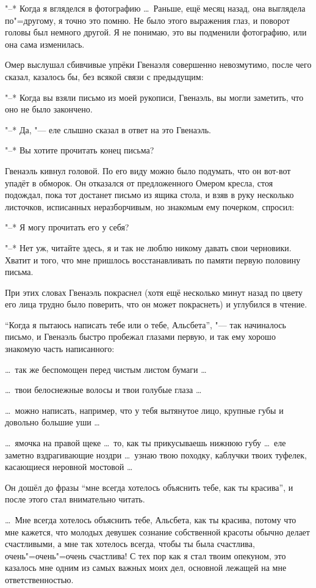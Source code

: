 "--* Когда я вгляделся в фотографию \ldots\
Раньше, ещё месяц назад, она выглядела по"=другому, я точно это помню.
Не было этого выражения глаз, и поворот головы был немного другой.
Я не понимаю, это вы подменили фотографию, или она сама изменилась.

Омер выслушал сбивчивые упрёки Гвенаэля совершенно невозмутимо, после чего
сказал, казалось бы, без всякой связи с предыдущим:

"--* Когда вы взяли письмо из моей рукописи, Гвенаэль, вы могли заметить, что
оно не было закончено.

"--* Да, "--- еле слышно сказал в ответ на это Гвенаэль.

"--* Вы хотите прочитать конец письма?

Гвенаэль кивнул головой.
По его виду можно было подумать, что он вот-вот упадёт в обморок.
Он отказался от предложенного Омером кресла, стоя подождал, пока тот достанет
письмо из ящика стола, и взяв в руку несколько листочков, исписанных
неразборчивым, но знакомым ему почерком, спросил:

"--* Я могу прочитать его у себя?

"--* Нет уж, читайте здесь, я и так не люблю никому давать свои черновики.
Хватит и того, что мне пришлось восстанавливать по памяти первую половину письма.

При этих словах Гвенаэль покраснел (хотя ещё несколько минут назад по цвету его
лица трудно было поверить, что он может покраснеть) и углубился в чтение.

\enquote{Когда я пытаюсь написать тебе или о тебе, Альсбета}, "--- так начиналось
письмо, и Гвенаэль быстро пробежал глазами первую, и так ему хорошо знакомую
часть написанного:

\ldots\ так же беспомощен перед чистым листом бумаги \ldots

\ldots\ твои белоснежные волосы и твои голубые глаза \ldots

\ldots\ можно написать, например, что у тебя вытянутое лицо, крупные губы и
довольно большие уши \ldots

\ldots\ ямочка на правой щеке \ldots\ то, как ты прикусываешь нижнюю губу
\ldots\ еле заметно вздрагивающие ноздри \ldots\ узнаю твою походку, каблучки
твоих туфелек, касающиеся неровной мостовой \ldots

Он дошёл до фразы \enquote{мне всегда хотелось объяснить тебе, как ты красива},
и после этого стал внимательно читать.

\medskip
\ldots\ Мне всегда хотелось объяснить тебе, Альсбета, как ты красива, потому что
мне кажется, что молодых девушек сознание собственной красоты обычно делает
счастливыми, а мне так хотелось всегда, чтобы ты была счастлива,
очень"=очень"=очень счастлива!
С тех пор как я стал твоим опекуном, это казалось мне одним из самых важных моих
дел, основной лежащей на мне ответственностью.

